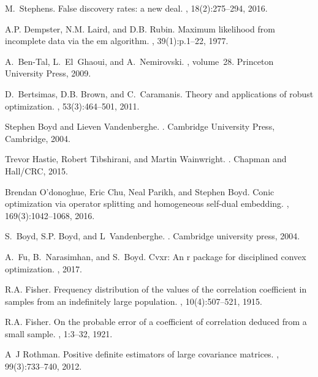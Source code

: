 \documentclass{bioinfo}
\begin{document}
\begin{thebibliography}{}
M.~Stephens.
\newblock False discovery rates: a new deal.
, 18(2):275--294, 2016.

A.P. Dempster, N.M. Laird, and D.B. Rubin.
\newblock Maximum likelihood from incomplete data via the em algorithm.
, 39(1):p.1--22, 1977.

A.~Ben-Tal, L.~El~Ghaoui, and A.~Nemirovski.
, volume~28.
\newblock Princeton University Press, 2009.

D.~Bertsimas, D.B. Brown, and C.~Caramanis.
\newblock Theory and applications of robust optimization.
, 53(3):464--501, 2011.

Stephen Boyd and Lieven Vandenberghe.
.
\newblock Cambridge University Press, Cambridge, 2004.

Trevor Hastie, Robert Tibshirani, and Martin Wainwright.
.
\newblock Chapman and Hall/CRC, 2015.

Brendan O’donoghue, Eric Chu, Neal Parikh, and Stephen Boyd.
\newblock Conic optimization via operator splitting and homogeneous self-dual
  embedding.
,
  169(3):1042--1068, 2016.

S.~Boyd, S.P. Boyd, and L~Vandenberghe.
.
\newblock Cambridge university press, 2004.

A.~Fu, B.~Narasimhan, and S.~Boyd.
\newblock Cvxr: An r package for disciplined convex optimization.
, 2017.

R.A. Fisher.
\newblock Frequency distribution of the values of the correlation coefficient
  in samples from an indefinitely large population.
, 10(4):507--521, 1915.

R.A. Fisher.
\newblock On the probable error of a coefficient of correlation deduced from a
  small sample.
, 1:3--32, 1921.

A~J Rothman.
\newblock Positive definite estimators of large covariance matrices.
, 99(3):733--740, 2012.


\end{thebibliography}
\end{document}
